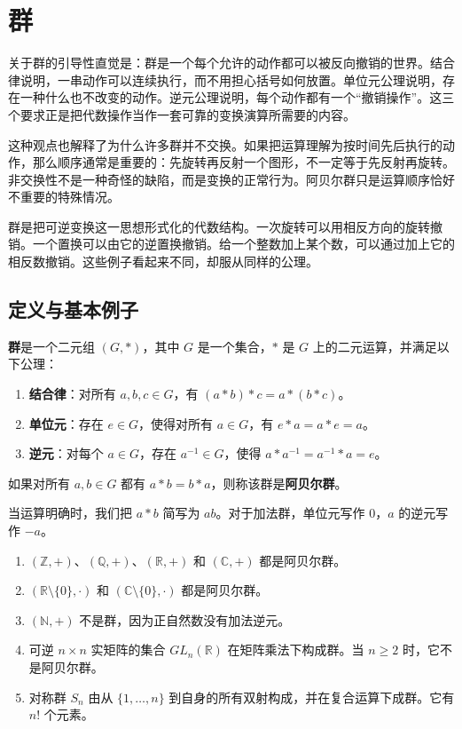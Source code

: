 \section{群}


关于群的引导性直觉是：群是一个每个允许的动作都可以被反向撤销的世界。结合律说明，一串动作可以连续执行，而不用担心括号如何放置。单位元公理说明，存在一种什么也不改变的动作。逆元公理说明，每个动作都有一个“撤销操作”。这三个要求正是把代数操作当作一套可靠的变换演算所需要的内容。

这种观点也解释了为什么许多群并不交换。如果把运算理解为按时间先后执行的动作，那么顺序通常是重要的：先旋转再反射一个图形，不一定等于先反射再旋转。非交换性不是一种奇怪的缺陷，而是变换的正常行为。阿贝尔群只是运算顺序恰好不重要的特殊情况。

群是把可逆变换这一思想形式化的代数结构。一次旋转可以用相反方向的旋转撤销。一个置换可以由它的逆置换撤销。给一个整数加上某个数，可以通过加上它的相反数撤销。这些例子看起来不同，却服从同样的公理。

\subsection{定义与基本例子}

\begin{definition}[群]
\textbf{群}是一个二元组 $(G,*)$，其中 $G$ 是一个集合，$*$ 是 $G$ 上的二元运算，并满足以下公理：
\begin{enumerate}
    \item \textbf{结合律}：对所有 $a,b,c\in G$，有 $(a*b)*c=a*(b*c)$。
    \item \textbf{单位元}：存在 $e\in G$，使得对所有 $a\in G$，有 $e*a=a*e=a$。
    \item \textbf{逆元}：对每个 $a\in G$，存在 $a^{-1}\in G$，使得 $a*a^{-1}=a^{-1}*a=e$。
\end{enumerate}
如果对所有 $a,b\in G$ 都有 $a*b=b*a$，则称该群是\textbf{阿贝尔群}。
\end{definition}

当运算明确时，我们把 $a*b$ 简写为 $ab$。对于加法群，单位元写作 $0$，$a$ 的逆元写作 $-a$。

\begin{example}[标准群]
\begin{enumerate}
    \item $(\mathbb{Z},+)$、$(\mathbb{Q},+)$、$(\mathbb{R},+)$ 和 $(\mathbb{C},+)$ 都是阿贝尔群。
    \item $(\mathbb{R}\setminus\{0\},\cdot)$ 和 $(\mathbb{C}\setminus\{0\},\cdot)$ 都是阿贝尔群。
    \item $(\mathbb{N},+)$ 不是群，因为正自然数没有加法逆元。
    \item 可逆 $n\times n$ 实矩阵的集合 $GL_n(\mathbb{R})$ 在矩阵乘法下构成群。当 $n\geq 2$ 时，它不是阿贝尔群。
    \item 对称群 $S_n$ 由从 $\{1,\dots,n\}$ 到自身的所有双射构成，并在复合运算下成群。它有 $n!$ 个元素。
\end{enumerate}
\end{example}

